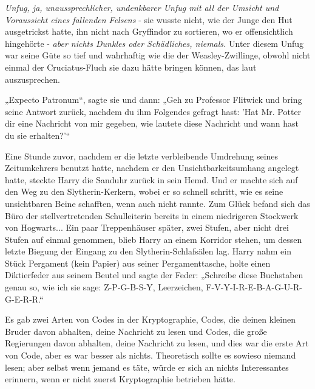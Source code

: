 {\emph{Unfug, ja, unaussprechlicher, undenkbarer Unfug mit all der Umsicht und Voraussicht eines fallenden Felsens} - sie wusste nicht, wie der Junge den Hut ausgetrickst hatte, ihn nicht nach Gryffindor zu sortieren, wo er offensichtlich hingehörte - \emph{aber nichts Dunkles oder Schädliches, niemals.} Unter diesem Unfug war seine Güte so tief und wahrhaftig wie die der Weasley-Zwillinge, obwohl nicht einmal der Cruciatus-Fluch sie dazu hätte bringen können, das laut auszusprechen.

„Expecto Patronum“, sagte sie und dann: „Geh zu Professor Flitwick und bring seine Antwort zurück, nachdem du ihm Folgendes gefragt hast: 'Hat Mr. Potter dir eine Nachricht von mir gegeben, wie lautete diese Nachricht und wann hast du sie erhalten?'“

Eine Stunde zuvor, nachdem er die letzte verbleibende Umdrehung seines Zeitumkehrers benutzt hatte, nachdem er den Unsichtbarkeitsumhang angelegt hatte, steckte Harry die Sanduhr zurück in sein Hemd. Und er machte sich auf den Weg zu den Slytherin-Kerkern, wobei er so schnell schritt, wie es seine unsichtbaren Beine schafften, wenn auch nicht rannte. Zum Glück befand sich das Büro der stellvertretenden Schulleiterin bereits in einem niedrigeren Stockwerk von Hogwarts... Ein paar Treppenhäuser später, zwei Stufen, aber nicht drei Stufen auf einmal genommen, blieb Harry an einem Korridor stehen, um dessen letzte Biegung der Eingang zu den Slytherin-Schlafsälen lag. Harry nahm ein Stück Pergament (kein Papier) aus seiner Pergamenttasche, holte einen Diktierfeder aus seinem Beutel und sagte der Feder: „Schreibe diese Buchstaben genau so, wie ich sie sage: Z-P-G-B-S-Y, Leerzeichen, F-V-Y-I-R-E-B-A-G-U-R-G-E-R-R.“

Es gab zwei Arten von Codes in der Kryptographie, Codes, die deinen kleinen Bruder davon abhalten, deine Nachricht zu lesen und Codes, die große Regierungen davon abhalten, deine Nachricht zu lesen, und dies war die erste Art von Code, aber es war besser als nichts. Theoretisch sollte es sowieso niemand lesen; aber selbst wenn jemand es täte, würde er sich an nichts Interessantes erinnern, wenn er nicht zuerst Kryptographie betrieben hätte.

}

